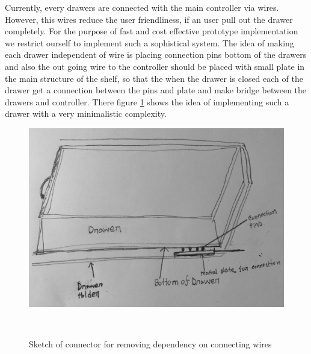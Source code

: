 Currently, every drawers are connected with the main controller via wires. However, this wires reduce the user friendliness, if an user pull out the drawer completely. For the purpose of fast and cost effective prototype implementation we restrict ourself to implement such a sophistical system. The idea of making each drawer independent of wire is placing connection pins bottom of the drawers and also the out going wire to the controller 
should be placed with small plate in the main structure of the shelf, so that the when the drawer is closed each of the drawer get a connection between the pins and plate and make bridge between the drawers and controller.
There figure \ref{fig:connector} shows the idea of implementing such a drawer with a very minimalistic complexity.
%
\begin{figure}
	\includegraphics[width=1\columnwidth]{figures/connector}
	\caption{Sketch of connector for removing dependency on connecting wires}~\label{fig:connector}
\end{figure}
%